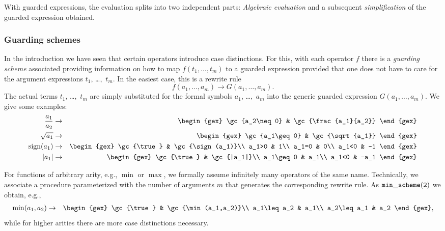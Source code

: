 With guarded expressions, the evaluation splits into two independent
parts: {\em Algebraic evaluation} and a subsequent {\em
simplification} of the guarded expression obtained.
%
\subsubsection{Guarding schemes}
In the introduction we have seen that certain operators introduce case
distinctions. For this, with each operator $f$ there is a {\em
guarding scheme} associated providing information on how to map
$f(t_1,\ldots,t_m)$ to a guarded expression provided that one does not
have to care for the argument expressions $t_1$, \dots,~$t_m$. In the
easiest case, this is a rewrite rule
$$
f(a_1,\ldots,a_m)\to G(a_1,\ldots,a_m).
$$
The actual terms $t_1$, \dots,~$t_m$ are simply substituted for the
formal symbols $a_1$, \dots,~$a_m$ into the generic guarded expression
$G(a_1,\ldots,a_m)$. We give some examples:
\begin{eqnarray}
\frac{a_1}{a_2} & \to &
\begin{gex}
\gc{a_2\neq 0} & \gc{\frac{a_1}{a_2}}
\end{gex}\nonumber\\
\sqrt{a_1} & \to &
\begin{gex}
\gc{a_1\geq 0} & \gc{\sqrt{a_1}}
\end{gex}\nonumber\\
\sign(a_1) & \to &
\begin{gex}
\gc{\true} & \gc{\sign(a_1)}\\
a_1>0 & 1\\
a_1=0 & 0\\
a_1<0 & -1
\end{gex}\nonumber\\
|a_1| & \to &
\begin{gex}
\gc{\true} & \gc{|a_1|}\\
a_1\geq0 & a_1\\
a_1<0 & -a_1
\end{gex}\label{absrewrite}
\end{eqnarray}

For functions of arbitrary arity, e.g., $\min$ or $\max$, we formally
assume infinitely many operators of the same name. Technically, we
associate a procedure parameterized with the number of arguments $m$
that generates the corresponding rewrite rule. As ${\tt
min\_scheme(2)}$ we obtain, e.g.,
\begin{eqnarray}
\min(a_1,a_2) & \to &
\begin{gex}
\gc{\true} & \gc{\min(a_1,a_2)}\\
a_1\leq a_2 & a_1\\
a_2\leq a_1 & a_2
\end{gex}\label{binminscheme},
\end{eqnarray}
while for higher arities there are more case distinctions necessary.

